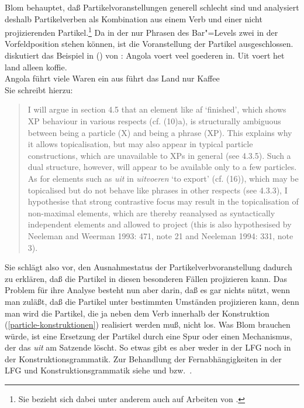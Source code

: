 Blom behauptet, daß Partikelvoranstellungen generell schlecht sind und analysiert
deshalb Partikelverben als Kombination aus einem Verb und einer nicht projizierenden Partikel.\footnote{
 Sie bezieht sich dabei unter anderem auch auf Arbeiten von \citet{Toivonen2002a}.%
}
Da in der \xbart nur Phrasen des Bar"=Levels zwei in der Vorfeldposition stehen können,
ist die Voranstellung der Partikel ausgeschlossen. \citet[]{Blom2005a} diskutiert 
das Beispiel in () von \citet[]{Hoeksema91a}:
\ea
\gll Angola voert veel goederen in. Uit voert het land alleen koffie.\\
     Angola führt viele Waren ein   aus führt das Land nur Kaffee\\
\z
Sie schreibt hierzu:
\begin{quote}
       I will argue in section 4.5 that an element like af `finished', which shows XP
behaviour in various respects (cf. (10)a), is structurally ambiguous between being a
particle (X) and being a phrase (XP). This explains why it allows topicalisation, but
may also appear in typical particle constructions, which are unavailable to XPs in
general (see 4.3.5). Such a dual structure, however, will appear to be available only
to a few particles. As for elements such as \emph{uit} in \emph{uitvoeren} `to export' (cf. (16)),
which may be topicalised but do not behave like phrases in other respects (see
4.3.3), I hypothesise that strong contrastive focus may result in the topicalisation of
non-maximal elements, which are thereby reanalysed as syntactically independent
elements and allowed to project (this is also hypothesised by Neeleman and
Weerman 1993: 471, note 21 and Neeleman 1994: 331, note 3).
\end{quote}
Sie schlägt also vor, den Ausnahmestatus der Partikelverbvoranstellung dadurch zu erklären,
daß die Partikel in diesen besonderen Fällen projizieren kann. Das Problem für ihre
Analyse besteht nun aber darin, daß es gar nichts nützt, wenn man zuläßt, daß die Partikel
unter bestimmten Umständen projizieren kann, denn man wird die Partikel, die ja neben dem
Verb innerhalb der Konstruktion (\ref{particle-konstruktionen}) realisiert werden muß, nicht los.
\z
Was Blom brauchen würde, ist eine Ersetzung der Partikel durch eine Spur oder einen
Mechanismus, der das \emph{uit} am Satzende löscht. So etwas gibt es aber weder in der LFG 
noch in der Konstruktionsgrammatik. Zur Behandlung
der Fernabhängigkeiten in der LFG und Konstruktionsgrammatik siehe  und  bzw.\
.

